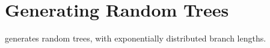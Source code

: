 \section{Generating Random Trees}
\label{sct_gen}

\gen{} generates random trees, with exponentially distributed branch lengths.
